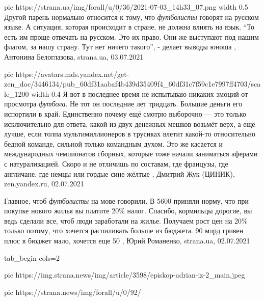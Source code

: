 \ifcmt
  pic https://strana.ua/img/forall/u/0/36/2021-07-03_14h33_07.png
	width 0.5
\fi
Другой парень нормально относится к тому, что \emph{футболисты} говорят на русском
языке. А ситуация, которая происходит в стране, не должна влиять на язык. 
\enquote{То есть им проще отвечать на русском. Это их право. Они же выступают под нашим
флагом, за нашу страну. Тут нет ничего такого}, - делает выводы юноша
, 
Антонина Белоглазова, strana.ua, 03.07.2021

\ifcmt
  pic https://avatars.mds.yandex.net/get-zen_doc/3446134/pub_60df31aabaf4b439d35409f4_60df31c7f59c1e7997ff4703/scale_1200
	width 0.4
\fi
Я вот в последнее время не испытываю никаких эмоций от просмотра \emph{футбола}. Не
тот он последние лет тридцать. Большие деньги его испортили в край. Единственно
почему ещё смотрю выборочно — это только исключительно для ответа, какой из
двух денежных мешков возьмёт верх, а ещё лучше, если толпа мультимиллионеров в
трусиках влетит какой-то относительно бедной команде, сильной только командным
духом. Это же касается и международных чемпионатов сборных, которые тоже начали
заниматься аферами с натурализацией. Скоро и не отличишь по составам, где
французы, где англичане, где немцы или гордые сине-жёлтые
, Дмитрий Жук (ЦИНИК), zen.yandex.ru, 02.07.2021

Главное, чтоб \emph{футболисты} на мове говорили.
В 5600 приняли норму, что при покупке нового жилья вы платите 20\% налог.
Спасибо, кормильцы дорогие, вы ведь сделали все, чтоб люди заработали на жилье.
Получаем рост цен на 20\% только потому, что хочется распиливать больше из
бюджета. 90 млрд гривен плюс в бюджет мало, хочется еще 50
, 
Юрий Романенко, strana.ua, 02.07.2021

\ifcmt
  tab_begin cols=2

     pic https://img.strana.news/img/article/3598/episkop-adrian-iz-2_main.jpeg

     pic https://strana.news/img/forall/u/0/92/%

